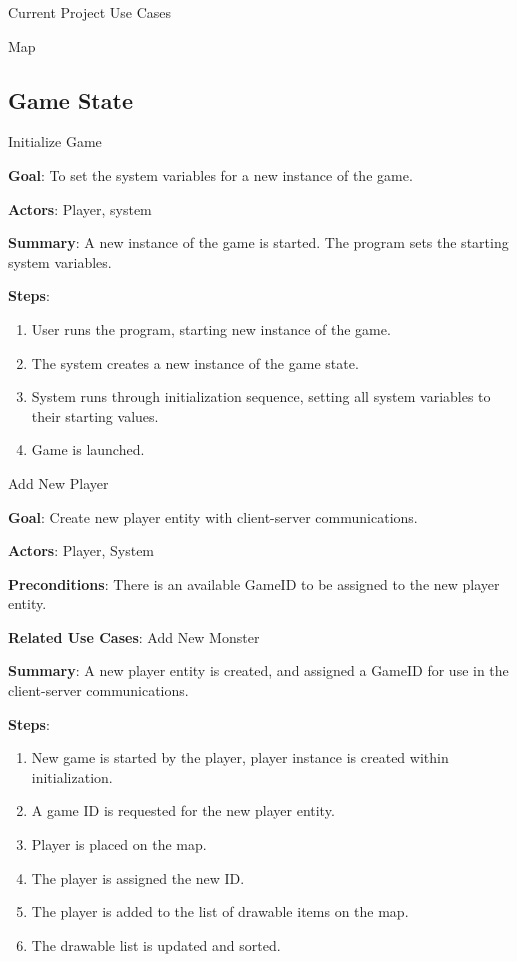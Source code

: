 \documentclass[12pt]{report}
\begin{document}
\begin{chapter}{Current Project Use Cases}
\begin{section}{Map}
  \section{Game State}

    \begin{subsection}{Initialize Game}

      \textbf{Goal}: 
      To set the system variables for a new instance of the game.

      \textbf{Actors}: 
      Player, system

      \textbf{Summary}: 
      A new instance of the game is started. The program sets the starting system variables.

      \textbf{Steps}:
      \begin{enumerate}
	\item User runs the program, starting new instance of the game.
	\item The system creates a new instance of the game state.
	\item System runs through initialization sequence, setting all system variables to their starting values.
	\item Game is launched.
      \end{enumerate}
    \end{subsection}

    \begin{subsection}{Add New Player}

      \textbf{Goal}:
      Create new player entity with client-server communications.
     
      \textbf{Actors}: 
      Player, System

      \textbf{Preconditions}: 
      There is an available GameID to be assigned to the new player entity.

      \textbf{Related Use Cases}: 
      Add New Monster
      
      \textbf{Summary}: 
      A new player entity is created, and assigned a GameID for use in the client-server communications.

      \textbf{Steps}:
      \begin{enumerate}
	\item New game is started by the player, player instance is created within initialization.
	\item A game ID is requested for the new player entity.
	\item Player is placed on the map.
	\item The player is assigned the new ID.
	\item The player is added to the list of drawable items on the map.
	\item The drawable list is updated and sorted.
      \end{enumerate}
    \end{subsection}
    

\end{section}
\end{chapter}
\end{document}
